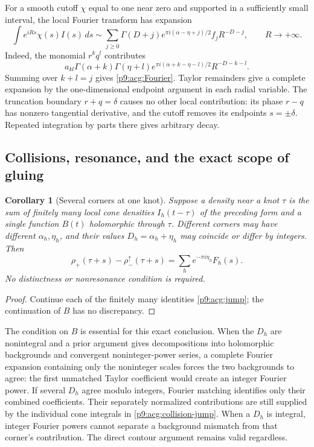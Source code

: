\documentclass[11pt,a4paper]{article}
\newtheorem{corollary}[theorem]{Corollary}
\theoremstyle{definition}
\theoremstyle{remark}
\numberwithin{equation}{section}
\begin{document}
For a smooth cutoff $\chi$ equal to one near zero and supported in a
sufficiently small interval, the local Fourier transform has expansion
\begin{equation}\label{p9:acg:Fourier}
 \int e^{iRs}\chi(s)I(s)\,ds\sim
 \sum_{j\geq0}\Gamma(D+j)
       e^{\pi i(\alpha-\eta+j)/2}f_j R^{-D-j},\qquad R\to+\infty.
\end{equation}
Indeed, the monomial $r^kq^l$ contributes
\[
 a_{kl}\Gamma(\alpha+k)\Gamma(\eta+l)
 e^{\pi i(\alpha+k-\eta-l)/2}R^{-D-k-l}.
\]
Summing over $k+l=j$ gives \eqref{p9:acg:Fourier}. Taylor remainders
give a complete expansion by the one-dimensional endpoint argument
in each radial variable. The truncation boundary $r+q=\delta$ causes
no other local contribution: its phase $r-q$ has nonzero tangential
derivative, and the cutoff removes its endpoints $s=\pm\delta$.
Repeated integration by parts there gives arbitrary decay.

\subsection{Collisions, resonance, and the exact scope of gluing}

\begin{corollary}[Several corners at one knot]\label{p9:acg:collision}
Suppose a density near a knot $\tau$ is the sum of finitely many local
cone densities $I_h(t-\tau)$ of the preceding form and a single
function $B(t)$ holomorphic through $\tau$. Different corners may
have different $\alpha_h,\eta_h$, and their values
$D_h=\alpha_h+\eta_h$ may coincide or differ by integers. Then
\begin{equation}\label{p9:acg:collision-jump}
 \rho_+(\tau+s)-\rho_-^\uparrow(\tau+s)
       =\sum_h e^{-\pi i\eta_h}F_h(s).
\end{equation}
No distinctness or nonresonance condition is required.
\end{corollary}

\begin{proof}
Continue each of the finitely many identities
\eqref{p9:acg:jump}; the continuation of $B$ has no discrepancy.
\end{proof}

The condition on $B$ is essential for this exact conclusion. When the
$D_h$ are nonintegral and a prior argument gives decompositions into
holomorphic backgrounds and convergent noninteger-power series, a
complete Fourier expansion containing only the noninteger scales
forces the two backgrounds to agree: the first unmatched Taylor
coefficient would create an integer Fourier power. If several
$D_h$ agree modulo integers, Fourier matching identifies only their
combined coefficients. Their separately normalized contributions are
still supplied by the individual cone integrals in
\eqref{p9:acg:collision-jump}. When a $D_h$ is integral, integer Fourier
powers cannot separate a background mismatch from that corner's
contribution. The direct contour argument remains valid regardless.
\end{document}

